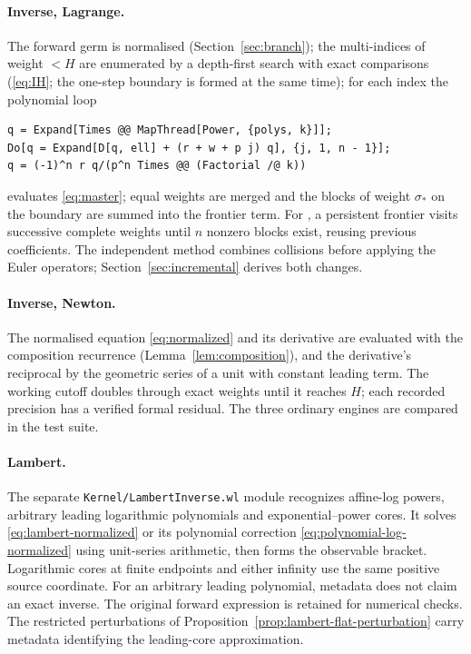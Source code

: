 \paragraph{Inverse, Lagrange.} The forward germ is normalised (Section~\ref{sec:branch}); the multi-indices of weight $<H$ are enumerated by a depth-first search with exact comparisons (\eqref{eq:IH}; the one-step boundary is formed at the same time); for each index the polynomial loop
\begin{lstlisting}
q = Expand[Times @@ MapThread[Power, {polys, k}]];
Do[q = Expand[D[q, ell] + (r + w + p j) q], {j, 1, n - 1}];
q = (-1)^n r q/(p^n Times @@ (Factorial /@ k))
\end{lstlisting}
evaluates \eqref{eq:master}; equal weights are merged and the blocks of weight $\sigma_*$ on the boundary are summed into the frontier term. For , a persistent frontier visits successive complete weights until $n$ nonzero blocks exist, reusing previous coefficients. The independent  method combines collisions before applying the Euler operators; Section~\ref{sec:incremental} derives both changes.

\paragraph{Inverse, Newton.} The normalised equation \eqref{eq:normalized} and its derivative are evaluated with the composition recurrence (Lemma~\ref{lem:composition}), and the derivative's reciprocal by the geometric series of a unit with constant leading term. The working cutoff doubles through exact weights until it reaches $H$; each recorded precision has a verified formal residual. The three ordinary engines are compared in the test suite.

\paragraph{Lambert.} The separate \texttt{Kernel/LambertInverse.wl} module recognizes affine-log powers, arbitrary leading logarithmic polynomials and exponential--power cores. It solves \eqref{eq:lambert-normalized} or its polynomial correction \eqref{eq:polynomial-log-normalized} using unit-series arithmetic, then forms the observable bracket. Logarithmic cores at finite endpoints and either infinity use the same positive source coordinate. For an arbitrary leading polynomial, metadata does not claim an exact  inverse. The original forward expression is retained for numerical checks. The restricted perturbations of Proposition~\ref{prop:lambert-flat-perturbation} carry metadata identifying the leading-core approximation.

